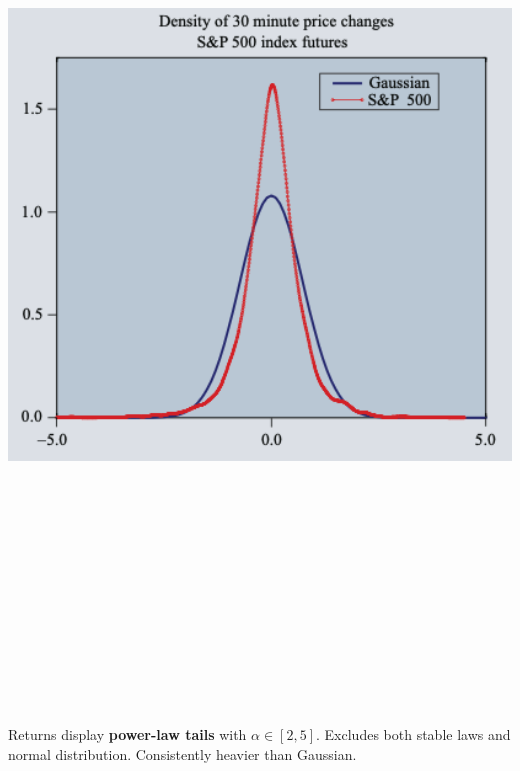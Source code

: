 \documentclass[final]{beamer}
\begin{document}
\begin{frame}[t]
\begin{columns}[t]
\begin{column}{.48\linewidth}
\vspace{0.5cm}

\begin{tcolorbox}[mybox, title=Heavy Tails Distribution]
\begin{center}
\includegraphics[width=0.98\linewidth,height=25cm,keepaspectratio]{figure2_density.png}
\end{center}
\vspace{0.3cm}
\large
Returns display \textbf{power-law tails} with $\alpha \in [2,5]$. Excludes both stable laws and normal distribution. Consistently heavier than Gaussian.
\end{tcolorbox}


\end{column}
\end{columns}
\end{frame}
\end{document}
